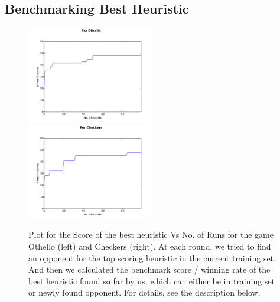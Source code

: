 \documentclass{scrartcl}
\begin{document}
{\subsection {Benchmarking Best Heuristic}

\begin{figure}[H]

      \includegraphics[width=0.5\textwidth]{othello/realwins}
\includegraphics[width=0.5\textwidth]{checkers/realwins}
  \caption{Plot for the Score of the best heuristic Vs No. of Runs for the game Othello (left) and Checkers (right). At each round, we tried to find an opponent for the top scoring heuristic in the current training set. And then we calculated the benchmark score / winning rate of the best heuristic found so far by us, which can either be in training set or newly found opponent. For details, see the description below.}
\end{figure}

}
\end{document}
